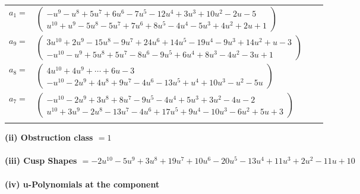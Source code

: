 \documentclass[1p]{elsarticle_modified}
\theoremstyle{definition}
\begin{document}
\begin{tabular}{m{7pt} m{180pt} m{7pt} m{180pt} }
\flushright $a_{1}=$&$\begin{pmatrix}- u^9- u^8+5 u^7+6 u^6-7 u^5-12 u^4+3 u^3+10 u^2-2 u-5\\u^{10}+u^9-5 u^8-5 u^7+7 u^6+8 u^5-4 u^4-5 u^3+4 u^2+2 u+1\end{pmatrix}$ \\
\flushright $a_{9}=$&$\begin{pmatrix}3 u^{10}+2 u^9-15 u^8-9 u^7+24 u^6+14 u^5-19 u^4-9 u^3+14 u^2+u-3\\- u^{10}- u^9+5 u^8+5 u^7-8 u^6-9 u^5+6 u^4+8 u^3-4 u^2-3 u+1\end{pmatrix}$ \\
\flushright $a_{8}=$&$\begin{pmatrix}4 u^{10}+4 u^9+\cdots+6 u-3\\- u^{10}-2 u^9+4 u^8+9 u^7-4 u^6-13 u^5+u^4+10 u^3- u^2-5 u\end{pmatrix}$ \\
\flushright $a_{7}=$&$\begin{pmatrix}- u^{10}-2 u^9+3 u^8+8 u^7-9 u^5-4 u^4+5 u^3+3 u^2-4 u-2\\u^{10}+3 u^9-2 u^8-13 u^7-4 u^6+17 u^5+9 u^4-10 u^3-6 u^2+5 u+3\end{pmatrix}$\\&\end{tabular}
\flushleft \textbf{(ii) Obstruction class $= 1$}\\~\\
\flushleft \textbf{(iii) Cusp Shapes $= -2 u^{10}-5 u^9+3 u^8+19 u^7+10 u^6-20 u^5-13 u^4+11 u^3+2 u^2-11 u+10$}\\~\\
\newpage\renewcommand{\arraystretch}{1}
\flushleft \textbf{(iv) u-Polynomials at the component}\newline \\
\end{document}
